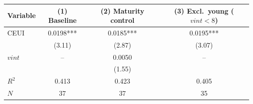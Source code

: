 \begin{tabular}{lccc}
\toprule
Variable & (1) Baseline & (2) Maturity control & (3) Excl.\ young ($vint < 8$) \\
\midrule
CEUI & 0.0198*** & 0.0185*** & 0.0195*** \\
 & (3.11) & (2.87) & (3.07) \\
$vint$ & -- & 0.0050 & -- \\
 & & (1.55) & \\
\midrule
$R^2$ & 0.413 & 0.423 & 0.405 \\
$N$ & 37 & 37 & 35 \\
\bottomrule
\end{tabular}
